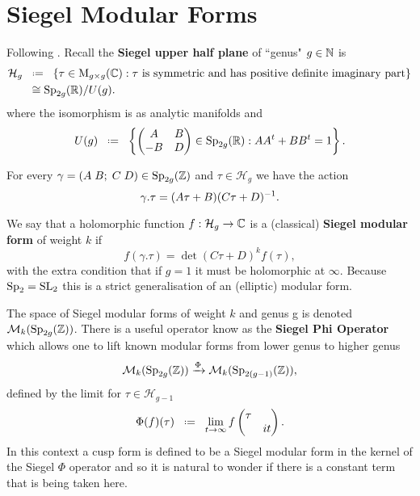 \section{Siegel Modular Forms}
Following \cite{bruinier123ModularForms2008}. Recall the \textbf{Siegel upper half plane} of ``genus" \(g\in \N\) is
\begin{equation*}
	\begin{aligned}
		\mathcal{H}_g &\defeq \{\tau \in \mathrm{M}_{g\times g}(\C) : \tau \text{ is symmetric and has positive definite imaginary part}\} \\
		&\;\; \cong \Sp_{2g}(\R) / U(g).
	\end{aligned}
\end{equation*}
where the isomorphism is as analytic manifolds  and 
\[U(g) \defeq \left\{\begin{pmatrix}
	A & B\\
	-B & D
\end{pmatrix}\in \Sp_{2g}(\R) : AA^t + BB^t = 1\right\}.\]

For every \(\gamma= (A \; B; \; C\; D) \in \Sp_{2g}(\Z)\) and \(\tau \in \mathcal{H}_g\) we have the action
\[\gamma.\tau = (A\tau + B)(C\tau + D)^{-1} .\]

We say that a holomorphic function \(f: \mathcal{H}_g \to \C\) is a (classical)\textbf{ Siegel modular form} of weight \(k\) if 
\[f(\gamma.\tau) = \det(C\tau + D)^kf(\tau),\]
with the extra condition that if \(g = 1\) it must be holomorphic at \(\infty\). Because \(\operatorname{Sp}_2 = \operatorname{SL}_2\) this is a strict generalisation of an (elliptic) modular form.

The space of Siegel modular forms of weight \(k\) and genus g is denoted \(\mathcal{M}_k(\Sp_{2g}(\Z))\). There is a useful operator know as the \textbf{Siegel Phi Operator} which allows one to lift known modular forms from lower genus to higher genus \cite[5]{bruinier123ModularForms2008}
\[\mathcal{M}_k(\Sp_{2g}(\Z)) \xrightarrow{\Phi} \mathcal{M}_{k}(\Sp_{2(g-1)}(\Z)),\]
defined by the limit for \(\tau\in \mathcal{H}_{g-1}\)
\[\Phi(f)(\tau) \defeq \lim_{t\to \infty} f\begin{pmatrix}
	\tau & \\
	& it 
\end{pmatrix}.\]
In this context a cusp form is defined to be a Siegel modular form in the kernel of the Siegel \(\Phi\) operator and so it is natural to wonder if there is a constant term that is being taken here. 

